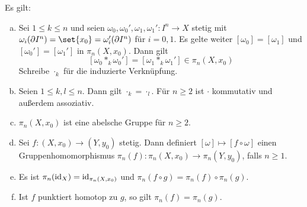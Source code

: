 \begin{proposition}[{name=[Gruppenstruktur und induzierte Abbildungen]},label=prop:eig-hom-gruppen]
	Es gilt:
	\begin{enumerate}[a)]
		\item Sei $1 \le k \le n$ und seien $\omega_0, \omega_0', \omega_1, \omega_1' \colon I^n \to X$ stetig mit $\omega_i (\partial I^n) = \set{x_0} = \omega_i'(\partial I^n)$ für $i=0,1$. 
		Es gelte weiter $[\omega_0] = [\omega_1]$ und $[\omega_0'] = [\omega_1']$ in $\pi_n(X,x_0)$. Dann gilt 
		\[
			[\omega_0 *_k \omega_0'] = [\omega_1 *_k \omega_1'] \in \pi_n(X, x_0)
		\]
		Schreibe $\cdot_k$ für die induzierte Verknüpfung.
		\item Seien $1 \le k,l \le n$. Dann gilt $\cdot_k = \cdot_l$. Für $n \ge 2$ ist $\cdot $ kommutativ und außerdem assoziativ.
		\item $\pi_n(X,x_0)$ ist eine abelsche Gruppe für $n \ge 2$.
		\item\label{prop:eig-hom-gruppen:enum:4} Sei $f \colon (X,x_0) \to (Y,y_0)$ stetig. 
		Dann definiert $[\omega] \mapsto [f \circ \omega]$ einen Gruppenhomomorphismus $\pi_n(f) \colon \pi_n(X,x_0) \to \pi_n(Y,y_0)$, falls $n \ge 1$.
		\item Es ist $\pi_n(\operatorname{id}_X) = \operatorname{id}_{\pi_n(X,x_0)}$ und $\pi_n(f \circ g) = \pi_n(f) \circ \pi_n(g)$.
		\item Ist $f$ punktiert homotop zu $g$, so gilt $\pi_n(f) = \pi_n(g)$.
	\end{enumerate}
\end{proposition}
